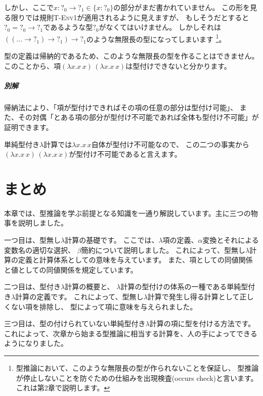\begin{exercise}
しかし、ここで$x : ?_0 \to ?_1 \in \{x : ?_0\}$の部分がまだ書かれていません。
この形を見る限りでは規則\textsc{T-Env1}が適用されるように見えますが、
もしそうだとすると$?_0 = ?_0 \to ?_1$であるような型$?_0$がなくてはいけません。
しかしそれは$((\dots \to ?_1) \to ?_1) \to ?_1$のような無限長の型になってしまいます
\footnote{型推論において、このような無限長の型が作られないことを保証し、
型推論が停止しないことを防ぐための仕組みを出現検査(occurs check)と言います。
これは第2章で説明します。}。

型の定義は帰納的であるため、このような無限長の型を作ることはできません。
このことから、項$(\lambda x . x \, x) \, (\lambda x . x \, x)$は型付けできないと分かります。

\subparagraph{別解}

帰納法により、「項が型付けできればその項の任意の部分は型付け可能」、
また、その対偶「とある項の部分が型付け不可能であれば全体も型付け不可能」が証明できます。

単純型付き$\lambda$計算では$\lambda x . x \, x$自体が型付け不可能なので、
この二つの事実から$(\lambda x . x \, x) \, (\lambda x . x \, x)$が型付け不可能であると言えます。

\end{exercise}

\section{まとめ}

本章では、型推論を学ぶ前提となる知識を一通り解説しています。主に三つの物事を説明しました。

一つ目は、型無し$\lambda$計算の基礎です。
ここでは、$\lambda$項の定義、$\alpha$変換とそれによる変数名の適切な選択、
$\beta$簡約について説明しました。
これによって、型無し$\lambda$計算の定義と計算体系としての意味を与えています。
また、項としての同値関係と値としての同値関係を規定しています。

二つ目は、型付き$\lambda$計算の概要と、
$\lambda$計算の型付けの体系の一種である単純型付き$\lambda$計算の定義です。
これによって、型無し$\lambda$計算で発生し得る計算として正しくない項を排除し、
型によって項に意味を与えられました。

三つ目は、型の付けられていない単純型付き$\lambda$計算の項に型を付ける方法です。
これによって、次章から始まる型推論に相当する計算を、人の手によってできるようになりました。

